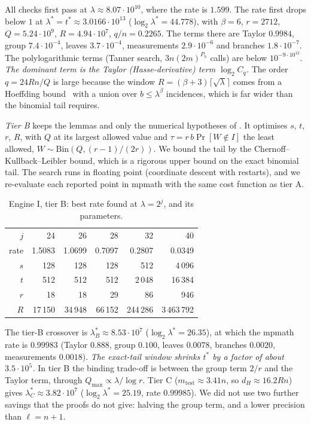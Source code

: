 \documentclass[10pt]{amsart}
\theoremstyle{definition}
\theoremstyle{remark}
\numberwithin{equation}{section}
\newcommand{\tst}{t^{*}}
\begin{document}
All checks first pass at $\lambda\approx8.07\cdot10^{10}$, where the rate is $1.599$. The rate first
drops below $1$ at $\lambda^*=\tst\approx3.0166\cdot10^{13}$ ($\log_2\lambda^*=44.778$), with
$\beta=6$, $r=2712$, $Q=5.24\cdot10^9$, $R=4.94\cdot10^7$, $q/n=0.2265$. The terms there are Taylor
$0.9984$, group $7.4\cdot10^{-4}$, leaves $3.7\cdot10^{-4}$, measurements $2.9\cdot10^{-6}$ and
branches $1.8\cdot10^{-7}$. The polylogarithmic terms (Tanner search, $3n(2m)^{P_h}$ calls) are
below $10^{-9\cdot10^{12}}$. \emph{The dominant term is the Taylor (Hasse-derivative) term
$\log_2C_q$.} The order $q=24Rn/Q$ is large because the window $R=(\beta+3)\lceil\sqrt\lambda\rceil$
comes from a Hoeffding bound~\cite{Hoeffding63} with a union over $b\le\lambda^\beta$ incidences,
which is far wider than the binomial tail requires.

\emph{Tier B} keeps the lemmas and only the numerical hypotheses of . It optimises
$s$, $t$, $r$, $R$, with $Q$ at its largest allowed value and $\tau=r\,b\Pr[W\notin I]$ the least
allowed, $W\sim\mathrm{Bin}(Q,(r-1)/(2r))$. We bound the tail by the Chernoff--Kullback--Leibler
bound, which is a rigorous upper bound on the exact binomial tail. The search runs in floating
point (coordinate descent with restarts), and we re-evaluate each reported point in mpmath with the
same cost function as tier A.

\begin{table}[ht]
\centering\small
\caption{Engine I, tier B: best rate found at $\lambda=2^j$, and its parameters.}\label{tab:oaiB}
\begin{tabular}{@{}rrrrrr@{}}
\toprule
$j$ & 24 & 26 & 28 & 32 & 40\\
rate & 1.5083 & 1.0699 & 0.7097 & 0.2807 & 0.0349\\
$s$ & 128 & 128 & 128 & 512 & 4\,096\\
$t$ & 512 & 512 & 512 & 2\,048 & 16\,384\\
$r$ & 18 & 18 & 29 & 86 & 946\\
$R$ & 17\,150 & 34\,948 & 66\,152 & 244\,286 & 3\,463\,792\\
\bottomrule
\end{tabular}
\end{table}

The tier-B crossover is $\lambda^*_B\approx8.53\cdot10^7$ ($\log_2\lambda^*=26.35$), at which the
mpmath rate is $0.99983$ (Taylor $0.888$, group $0.100$, leaves $0.0078$, branches $0.0020$,
measurements $0.0018$). \emph{The exact-tail window shrinks $\tst$ by a factor of about
$3.5\cdot10^5$.} In tier B the binding trade-off is between the group term $2/r$ and the Taylor
term, through $Q_{\max}\propto\lambda/\log r$. Tier C ($m_{\mathrm{test}}\approx3.41n$, so
$d_H\approx16.2Rn$) gives $\lambda^*_C\approx3.82\cdot10^7$ ($\log_2\lambda^*=25.19$, rate $0.99985$).
We did not use two further savings that the proofs do not give: halving the group term, and a lower
precision than $\ell=n+1$.
\end{document}
